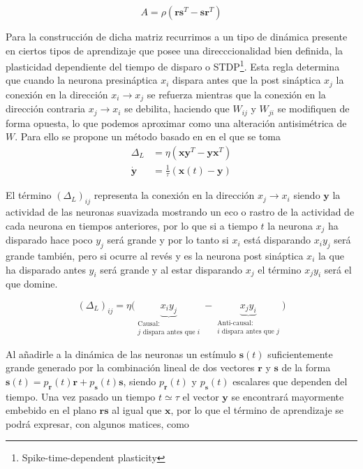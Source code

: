 \documentclass[11pt,a4paper,twoside,pdf]{article}
\numberwithin{equation}{section}
\begin{document}
\begin{equation}
  A = \rho(\mathbf{rs}^T - \mathbf{sr}^T)
\end{equation}

Para la construcción de dicha matriz recurrimos a un tipo de dinámica presente en ciertos tipos de aprendizaje que posee una direcccionalidad bien definida, la plasticidad dependiente del tiempo de disparo o STDP\footnote{Spike-time-dependent plasticity}. Esta regla determina que cuando la neurona presináptica \(x_i\) dispara antes que la post sináptica \(x_j\) la conexión en la dirección \(x_i \rightarrow x_j\) se refuerza mientras que la conexión en la dirección contraria \(x_j \rightarrow x_i\) se debilita, haciendo que \(W_{ij}\) y \(W_{ji}\) se modifiquen de forma opuesta, lo que podemos aproximar como una alteración antisimétrica de \(W\). Para ello se propone un método basado en \textcite{susman2019} en el que se toma 
\begin{align}
  \Delta_L &= \eta \left(\mathbf{xy}^T - \mathbf{yx}^T\right)\\
  \dot{\mathbf{y}} &= \frac{1}{\tau}(\mathbf{x}(t) - \mathbf{y})
\end{align}

El término \((\Delta_L)_{ij}\) representa la conexión en la dirección \(x_j \rightarrow x_i\) siendo \(\mathbf{y}\) la actividad de las neuronas suavizada mostrando un eco o rastro de la actividad de cada neurona en tiempos anteriores, por lo que si a tiempo \(t\) la neurona \(x_j\) ha disparado hace poco \(y_j\) será grande y por lo tanto si \(x_i\) está disparando \(x_i y_j\) será grande también, pero si ocurre al revés y es la neurona post sináptica \(x_i\) la que ha disparado antes \(y_i\) será grande y al estar disparando \(x_j\) el término \(x_jy_i\) será el que domine. 

\begin{equation}
  (\Delta_L)_{ij} = \eta \Big( \underbrace{x_i y_j}_{\substack{\text{Causal:} \\ j \text{ dispara antes que } i}} - \underbrace{x_j y_i}_{\substack{\text{Anti-causal:} \\ i \text{ dispara antes que } j}} \Big)
\end{equation}

Al añadirle a la dinámica de las neuronas un estímulo \(\mathbf{s}(t)\) suficientemente grande generado por la combinación lineal de dos vectores \(\mathbf{r}\) y \(\mathbf{s}\) de la forma \(\mathbf{s}(t) = p_\mathbf{r}(t) \mathbf{r} + p_\mathbf{s}(t) \mathbf{s}\), siendo \(p_\mathbf{r}(t)\) y \(p_\mathbf{s}(t)\) escalares que dependen del tiempo. Una vez pasado un tiempo \(t\simeq \tau\) el vector \(\mathbf{y}\) se encontrará mayormente embebido en el plano \(\mathbf{rs}\) al igual que \(\mathbf{x}\), por lo que el término de aprendizaje se podrá expresar, con algunos matices, como 
\end{document}
